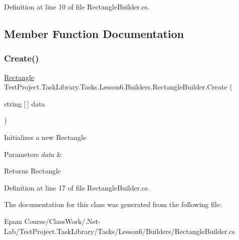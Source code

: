 Definition at line 10 of file Rectangle\+Builder.\+cs.



\subsection{Member Function Documentation}
\mbox{\label{class_test_project_1_1_task_library_1_1_tasks_1_1_lesson6_1_1_builders_1_1_rectangle_builder_aa3c17c0892a5ad74eedd86a99b05f6ca}} 
\subsubsection{\texorpdfstring{Create()}{Create()}}
{\footnotesize\ttfamily \mbox{\hyperlink{class_test_project_1_1_task_library_1_1_tasks_1_1_lesson6_1_1_models_1_1_rectangle}{Rectangle}} Test\+Project.\+Task\+Library.\+Tasks.\+Lesson6.\+Builders.\+Rectangle\+Builder.\+Create (\begin{DoxyParamCaption}\item[{string \mbox{[}$\,$\mbox{]}}]{data }\end{DoxyParamCaption})}



Initializes a new Rectangle 


\begin{DoxyParams}{Parameters}
{\em data} & \\
\hline
\end{DoxyParams}
\begin{DoxyReturn}{Returns}
Rectangle
\end{DoxyReturn}


Definition at line 17 of file Rectangle\+Builder.\+cs.



The documentation for this class was generated from the following file\+:\begin{DoxyCompactItemize}
\item 
Epam Course/\+Class\+Work/.\+Net-\/\+Lab/\+Test\+Project.\+Task\+Library/\+Tasks/\+Lesson6/\+Builders/Rectangle\+Builder.\+cs\end{DoxyCompactItemize}

